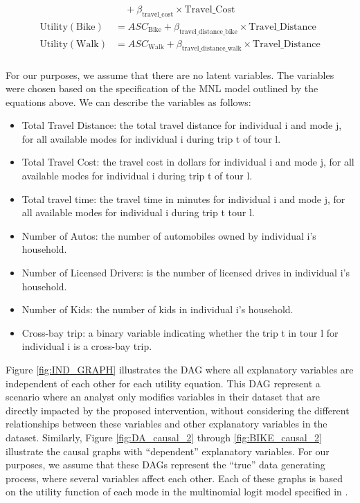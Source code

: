 \begin{equation*}
\begin{aligned}
   &\quad + \beta_{\textrm{travel\_cost}} \times \textrm{Travel\_Cost} \\
   \textrm{Utility} \left(\textrm{Bike}\right) &= ASC_{\textrm{Bike}} + \beta_{\textrm{travel\_distance\_bike}} \times \textrm{Travel\_Distance} \\
   \textrm{Utility} \left(\textrm{Walk}\right) &= ASC_{\textrm{Walk}} + \beta_{\textrm{travel\_distance\_walk}} \times \textrm{Travel\_Distance} \\
   \end{aligned}
\end{equation*}


For our purposes, we assume that there are no latent variables.
The variables were chosen based on the specification of the MNL model outlined by the equations above.
We can describe the variables as follows:

\begin{itemize}
  \item Total Travel Distance: the total travel distance for individual i and mode j, for all available modes for individual i during trip t of tour l.
  \item Total Travel Cost: the travel cost in dollars for individual i and mode j, for all available modes for individual i during trip t of tour l.
  \item Total travel time: the travel time in minutes for individual i and mode j, for all available modes for individual i during trip t tour l.
  \item Number of Autos: the number of automobiles owned by individual i's household.
  \item Number of Licensed Drivers: is the number of licensed drives in individual i's household.
  \item Number of Kids: the number of kids in individual i's household.
  \item Cross-bay trip: a binary variable indicating whether the trip t in tour l for individual i is a cross-bay trip.
\end{itemize}

Figure \ref{fig:IND_GRAPH} illustrates the DAG where all explanatory variables are independent of each other for each utility equation.
This DAG represent a scenario where an analyst only modifies variables in their dataset that are directly impacted by the proposed intervention, without considering the different relationships between these variables and other explanatory variables in the dataset.
Similarly, Figure \ref{fig:DA_causal_2} through \ref{fig:BIKE_causal_2} illustrate the causal graphs with ``dependent'' explanatory variables.
For our purposes, we assume that these DAGs represent the ``true'' data generating process, where several variables affect each other.
Each of these graphs is based on the utility function of each mode in the multinomial logit model specified in \citet{brathwaite_asymmetric}.

